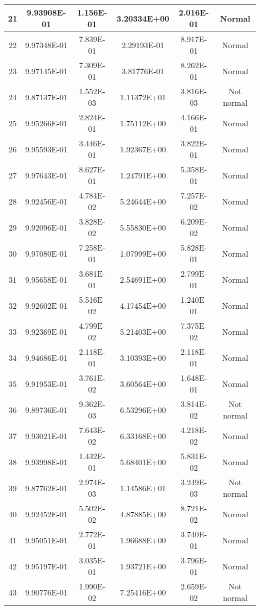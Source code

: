 \begin{table}[h]
\begin{tabular}{|c|c|c|c|c|c|}
		21 & 9.93908E-01 & 1.156E-01 & 3.20334E+00 & 2.016E-01 & Normal\\\hline
		22 & 9.97348E-01 & 7.839E-01 & 2.29193E-01 & 8.917E-01 & Normal\\\hline
		23 & 9.97145E-01 & 7.309E-01 & 3.81776E-01 & 8.262E-01 & Normal\\\hline
		24 & 9.87137E-01 & 1.552E-03 & 1.11372E+01 & 3.816E-03 & Not normal\\\hline
		25 & 9.95266E-01 & 2.824E-01 & 1.75112E+00 & 4.166E-01 & Normal\\\hline
		26 & 9.95593E-01 & 3.446E-01 & 1.92367E+00 & 3.822E-01 & Normal\\\hline
		27 & 9.97643E-01 & 8.627E-01 & 1.24791E+00 & 5.358E-01 & Normal\\\hline
		28 & 9.92456E-01 & 4.784E-02 & 5.24644E+00 & 7.257E-02 & Normal\\\hline
		29 & 9.92096E-01 & 3.828E-02 & 5.55830E+00 & 6.209E-02 & Normal\\\hline
		30 & 9.97080E-01 & 7.258E-01 & 1.07999E+00 & 5.828E-01 & Normal\\\hline
		31 & 9.95658E-01 & 3.681E-01 & 2.54691E+00 & 2.799E-01 & Normal\\\hline
		32 & 9.92602E-01 & 5.516E-02 & 4.17454E+00 & 1.240E-01 & Normal\\\hline
		33 & 9.92369E-01 & 4.799E-02 & 5.21403E+00 & 7.375E-02 & Normal\\\hline
		34 & 9.94686E-01 & 2.118E-01 & 3.10393E+00 & 2.118E-01 & Normal\\\hline
		35 & 9.91953E-01 & 3.761E-02 & 3.60564E+00 & 1.648E-01 & Normal\\\hline
		36 & 9.89736E-01 & 9.362E-03 & 6.53296E+00 & 3.814E-02 & Not normal\\\hline
		37 & 9.93021E-01 & 7.643E-02 & 6.33168E+00 & 4.218E-02 & Normal\\\hline
		38 & 9.93998E-01 & 1.432E-01 & 5.68401E+00 & 5.831E-02 & Normal\\\hline
		39 & 9.87762E-01 & 2.974E-03 & 1.14586E+01 & 3.249E-03 & Not normal\\\hline
		40 & 9.92452E-01 & 5.502E-02 & 4.87885E+00 & 8.721E-02 & Normal\\\hline
		41 & 9.95051E-01 & 2.772E-01 & 1.96688E+00 & 3.740E-01 & Normal\\\hline
		42 & 9.95197E-01 & 3.035E-01 & 1.93721E+00 & 3.796E-01 & Normal\\\hline
		43 & 9.90776E-01 & 1.990E-02 & 7.25416E+00 & 2.659E-02 & Not normal\\\hline

\end{tabular}
\end{table}

